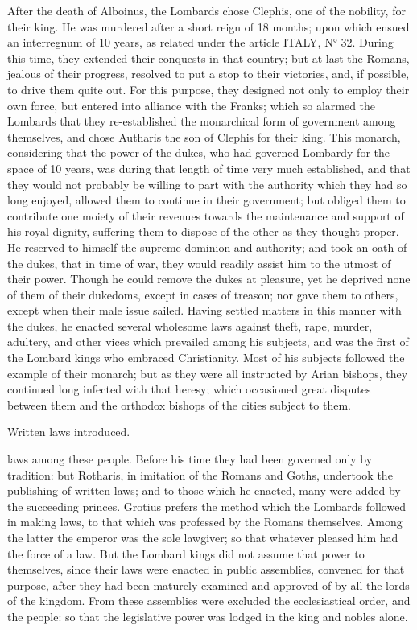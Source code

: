 \documentclass{article}
\begin{document}
After the death of Alboinus, the Lombards chose Clephis, one of the nobility, for their king. He was murdered after a short reign of 18 months; upon which ensued an interregnum of 10 years, as related under the article ITALY, N° 32. During this time, they extended their conquests in that country; but at last the Romans, jealous of their progress, resolved to put a stop to their victories, and, if possible, to drive them quite out. For this purpose, they designed not only to employ their own force, but entered into alliance with the Franks; which so alarmed the Lombards that they re-established the monarchical form of government among themselves, and chose Autharis the son of Clephis for their king. This monarch, considering that the power of the dukes, who had governed Lombardy for the space of 10 years, was during that length of time very much established, and that they would not probably be willing to part with the authority which they had so long enjoyed, allowed them to continue in their government; but obliged them to contribute one moiety of their revenues towards the maintenance and support of his royal dignity, suffering them to dispose of the other as they thought proper. He reserved to himself the supreme dominion and authority; and took an oath of the dukes, that in time of war, they would readily assist him to the utmost of their power. Though he could remove the dukes at pleasure, yet he deprived none of them of their dukedoms, except in cases of treason; nor gave them to others, except when their male issue sailed. Having settled matters in this manner with the dukes, he enacted several wholesome laws against theft, rape, murder, adultery, and other vices which prevailed among his subjects, and was the first of the Lombard kings who embraced Christianity. Most of his subjects followed the example of their monarch; but as they were all instructed by Arian bishops, they continued long infected with that heresy; which occasioned great disputes between them and the orthodox bishops of the cities subject to them.

Written laws introduced.

laws among these people. Before his time they had been governed only by tradition: but Rotharis, in imitation of the Romans and Goths, undertook the publishing of written laws; and to those which he enacted, many were added by the succeeding princes. Grotius prefers the method which the Lombards followed in making laws, to that which was professed by the Romans themselves. Among the latter the emperor was the sole lawgiver; so that whatever pleased him had the force of a law. But the Lombard kings did not assume that power to themselves, since their laws were enacted in public assemblies, convened for that purpose, after they had been maturely examined and approved of by all the lords of the kingdom. From these assemblies were excluded the ecclesiastical order, and the people: so that the legislative power was lodged in the king and nobles alone.
\end{document}
